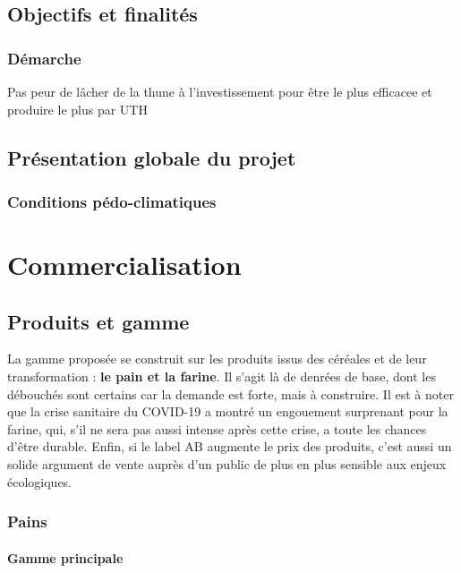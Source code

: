 \documentclass{book}
\begin{document}
\section{Objectifs et finalités}

\subsection{Démarche}

Pas peur de lâcher de la thune à l'investissement pour être le plus efficacee et produire le plus par UTH

\section{Présentation globale du projet}

\subsection{Conditions pédo-climatiques}

\chapter{Commercialisation}

\section{Produits et gamme}

La gamme proposée se construit sur les produits issus des céréales et de leur transformation : \textbf{le pain et la farine}. Il s'agit là de denrées de base, dont les débouchés sont certains car la demande est forte, mais à construire. Il est à noter que la crise sanitaire du COVID-19 a montré un engouement surprenant pour la farine, qui, s'il ne sera pas aussi intense après cette crise, a toute les chances d'être durable. Enfin, si le label AB augmente le prix des produits, c'est aussi un solide argument de vente auprès d'un public de plus en plus sensible aux enjeux écologiques. 

\subsection{Pains}

\subsubsection{Gamme principale}
\end{document}
